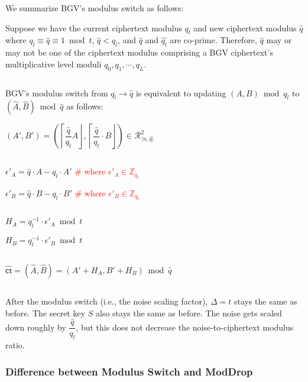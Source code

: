 $ $

We summarize BGV's modulus switch as follows:



\begin{tcolorbox}[title={\textbf{\tboxlabel{\ref*{subsec:bgv-modulus-switch}} BGV's Modulus Switch}}]

Suppose we have the current ciphertext modulus $q_l$ and new ciphertext modulus $\hat{q}$ where $q_l \equiv \hat{q} \equiv 1 \bmod t$, $\hat{q} < q_l$, and $\hat{q}$ and $\hat{q_l}$ are co-prime. Therefore, $\hat{q}$ may or may not be one of the ciphertext modulus comprising a BGV ciphertext's multiplicative level moduli $q_0, q_1, \cdots, q_L$.

$ $

BGV's modulus switch from $q_l \rightarrow \hat{q}$ is equivalent to updating $(A, B) \bmod q_l$ to $(\hat A, \hat B) \bmod \hat{q}$ as follows:


$(A', B') = \left(\left\lceil\dfrac{\hat{q}}{q_l} A\right\rfloor, \left\lceil\dfrac{\hat{q}}{q_l}\cdot B\right\rfloor\right) \in \mathcal{R}_{\langle n, \hat{q} \rangle}^2$

$ $

$\epsilon'_A = \hat{q}\cdot A - q_l\cdot A'$ \textcolor{red}{ \# where $\epsilon'_A \in \mathbb{Z}_{q_l}$}

$\epsilon'_B = \hat{q}\cdot B - q_l\cdot B'$ \textcolor{red}{ \# where $\epsilon'_B \in \mathbb{Z}_{q_l}$}


$ $

$H_A = q_l^{-1}\cdot\epsilon'_A \bmod t$

$H_B = q_l^{-1}\cdot\epsilon'_B \bmod t$

$ $

$\hat{\textsf{ct}} = (\hat{A}, \hat{B}) = (A' + H_A, B' + H_B) \bmod \hat{q}$

$ $

After the modulus switch (i.e., the noise scaling factor), $\Delta = t$ stays the same as before. The secret key $S$ also stays the same as before. The noise gets scaled down roughly by $\dfrac{\hat{q}}{q_l}$, but this does not decrease the noise-to-ciphertext modulus ratio. 

\end{tcolorbox}



\subsubsection{Difference between Modulus Switch and \textsf{ModDrop}}
\label{subsubsec:bgv-moddrop-vs-modswitch}

